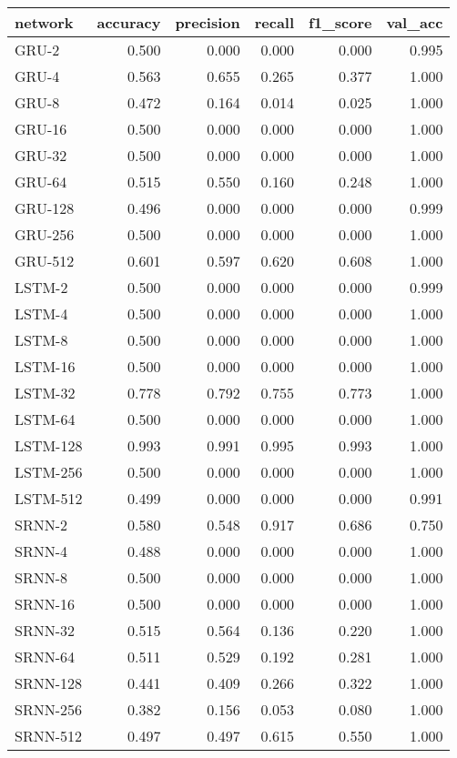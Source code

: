\begin{tabular}{lrrrrr}
\toprule
  network &  accuracy &  precision &  recall &  f1\_score &  val\_acc \\
\midrule
    GRU-2 &     0.500 &      0.000 &   0.000 &     0.000 &    0.995 \\
    GRU-4 &     0.563 &      0.655 &   0.265 &     0.377 &    1.000 \\
    GRU-8 &     0.472 &      0.164 &   0.014 &     0.025 &    1.000 \\
   GRU-16 &     0.500 &      0.000 &   0.000 &     0.000 &    1.000 \\
   GRU-32 &     0.500 &      0.000 &   0.000 &     0.000 &    1.000 \\
   GRU-64 &     0.515 &      0.550 &   0.160 &     0.248 &    1.000 \\
  GRU-128 &     0.496 &      0.000 &   0.000 &     0.000 &    0.999 \\
  GRU-256 &     0.500 &      0.000 &   0.000 &     0.000 &    1.000 \\
  GRU-512 &     0.601 &      0.597 &   0.620 &     0.608 &    1.000 \\
   LSTM-2 &     0.500 &      0.000 &   0.000 &     0.000 &    0.999 \\
   LSTM-4 &     0.500 &      0.000 &   0.000 &     0.000 &    1.000 \\
   LSTM-8 &     0.500 &      0.000 &   0.000 &     0.000 &    1.000 \\
  LSTM-16 &     0.500 &      0.000 &   0.000 &     0.000 &    1.000 \\
  LSTM-32 &     0.778 &      0.792 &   0.755 &     0.773 &    1.000 \\
  LSTM-64 &     0.500 &      0.000 &   0.000 &     0.000 &    1.000 \\
 LSTM-128 &     0.993 &      0.991 &   0.995 &     0.993 &    1.000 \\
 LSTM-256 &     0.500 &      0.000 &   0.000 &     0.000 &    1.000 \\
 LSTM-512 &     0.499 &      0.000 &   0.000 &     0.000 &    0.991 \\
   SRNN-2 &     0.580 &      0.548 &   0.917 &     0.686 &    0.750 \\
   SRNN-4 &     0.488 &      0.000 &   0.000 &     0.000 &    1.000 \\
   SRNN-8 &     0.500 &      0.000 &   0.000 &     0.000 &    1.000 \\
  SRNN-16 &     0.500 &      0.000 &   0.000 &     0.000 &    1.000 \\
  SRNN-32 &     0.515 &      0.564 &   0.136 &     0.220 &    1.000 \\
  SRNN-64 &     0.511 &      0.529 &   0.192 &     0.281 &    1.000 \\
 SRNN-128 &     0.441 &      0.409 &   0.266 &     0.322 &    1.000 \\
 SRNN-256 &     0.382 &      0.156 &   0.053 &     0.080 &    1.000 \\
 SRNN-512 &     0.497 &      0.497 &   0.615 &     0.550 &    1.000 \\
\bottomrule
\end{tabular}
